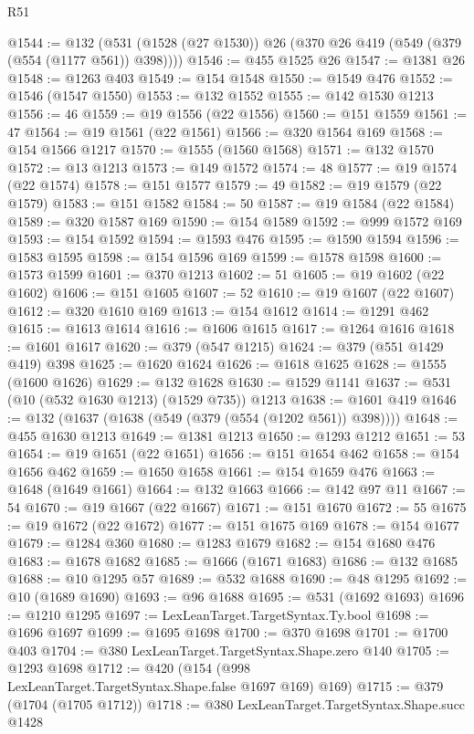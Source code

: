 \begin{lexlean}{R51}
\begin{coremodule}
@1544 := @132 (@531 (@1528 (@27 @1530)) @26 (@370 @26 @419 (@549 (@379 (@554 (@1177 @561)) @398))))
@1546 := @455 @1525 @26
@1547 := @1381 @26
@1548 := @1263 @403
@1549 := @154 @1548
@1550 := @1549 @476
@1552 := @1546 (@1547 @1550)
@1553 := @132 @1552
@1555 := @142 @1530 @1213
@1556 := 46
@1559 := @19 @1556 (@22 @1556)
@1560 := @151 @1559
@1561 := 47
@1564 := @19 @1561 (@22 @1561)
@1566 := @320 @1564 @169
@1568 := @154 @1566 @1217
@1570 := @1555 (@1560 @1568)
@1571 := @132 @1570
@1572 := @13 @1213
@1573 := @149 @1572
@1574 := 48
@1577 := @19 @1574 (@22 @1574)
@1578 := @151 @1577
@1579 := 49
@1582 := @19 @1579 (@22 @1579)
@1583 := @151 @1582
@1584 := 50
@1587 := @19 @1584 (@22 @1584)
@1589 := @320 @1587 @169
@1590 := @154 @1589
@1592 := @999 @1572 @169
@1593 := @154 @1592
@1594 := @1593 @476
@1595 := @1590 @1594
@1596 := @1583 @1595
@1598 := @154 @1596 @169
@1599 := @1578 @1598
@1600 := @1573 @1599
@1601 := @370 @1213
@1602 := 51
@1605 := @19 @1602 (@22 @1602)
@1606 := @151 @1605
@1607 := 52
@1610 := @19 @1607 (@22 @1607)
@1612 := @320 @1610 @169
@1613 := @154 @1612
@1614 := @1291 @462
@1615 := @1613 @1614
@1616 := @1606 @1615
@1617 := @1264 @1616
@1618 := @1601 @1617
@1620 := @379 (@547 @1215)
@1624 := @379 (@551 @1429 @419) @398
@1625 := @1620 @1624
@1626 := @1618 @1625
@1628 := @1555 (@1600 @1626)
@1629 := @132 @1628
@1630 := @1529 @1141
@1637 := @531 (@10 (@532 @1630 @1213) (@1529 @735)) @1213
@1638 := @1601 @419
@1646 := @132 (@1637 (@1638 (@549 (@379 (@554 (@1202 @561)) @398))))
@1648 := @455 @1630 @1213
@1649 := @1381 @1213
@1650 := @1293 @1212
@1651 := 53
@1654 := @19 @1651 (@22 @1651)
@1656 := @151 @1654 @462
@1658 := @154 @1656 @462
@1659 := @1650 @1658
@1661 := @154 @1659 @476
@1663 := @1648 (@1649 @1661)
@1664 := @132 @1663
@1666 := @142 @97 @11
@1667 := 54
@1670 := @19 @1667 (@22 @1667)
@1671 := @151 @1670
@1672 := 55
@1675 := @19 @1672 (@22 @1672)
@1677 := @151 @1675 @169
@1678 := @154 @1677
@1679 := @1284 @360
@1680 := @1283 @1679
@1682 := @154 @1680 @476
@1683 := @1678 @1682
@1685 := @1666 (@1671 @1683)
@1686 := @132 @1685
@1688 := @10 @1295 @57
@1689 := @532 @1688
@1690 := @48 @1295
@1692 := @10 (@1689 @1690)
@1693 := @96 @1688
@1695 := @531 (@1692 @1693)
@1696 := @1210 @1295
@1697 := LexLeanTarget.TargetSyntax.Ty.bool
@1698 := @1696 @1697
@1699 := @1695 @1698
@1700 := @370 @1698
@1701 := @1700 @403
@1704 := @380 LexLeanTarget.TargetSyntax.Shape.zero @140
@1705 := @1293 @1698
@1712 := @420 (@154 (@998 LexLeanTarget.TargetSyntax.Shape.false @1697 @169) @169)
@1715 := @379 (@1704 (@1705 @1712))
@1718 := @380 LexLeanTarget.TargetSyntax.Shape.succ @1428

\end{coremodule}
\end{lexlean}
